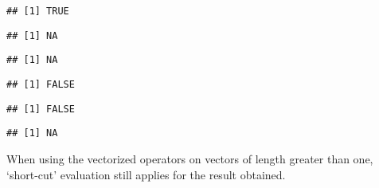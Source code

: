 \documentclass[paper=a4,headsepline,BCOR=12mm,twoside,open=right,%
titlepage,headings=small,fontsize=10pt,index=totoc,bibliography=totoc,%
captions=tableheading,captions=nooneline]{scrbook}\usepackage{knitr}
\begin{document}
\begin{knitrout}\footnotesize
{}\color{fgcolor}\begin{kframe}
\begin{alltt}
 \hlopt{||} 
\end{alltt}
\begin{verbatim}
## [1] TRUE
\end{verbatim}
\begin{alltt}
 \hlopt{||} 
\end{alltt}
\begin{verbatim}
## [1] NA
\end{verbatim}
\begin{alltt}
 \hlopt{&&} 
\end{alltt}
\begin{verbatim}
## [1] NA
\end{verbatim}
\begin{alltt}
 \hlopt{&&} 
\end{alltt}
\begin{verbatim}
## [1] FALSE
\end{verbatim}
\begin{alltt}
 \hlopt{&&}  \hlopt{&&} 
\end{alltt}
\begin{verbatim}
## [1] FALSE
\end{verbatim}
\begin{alltt}
 \hlopt{&&}  \hlopt{&&} 
\end{alltt}
\begin{verbatim}
## [1] NA
\end{verbatim}
\end{kframe}
\end{knitrout}

When using the vectorized operators on vectors of length greater than one, `short-cut' evaluation still applies for the result obtained.
\end{document}
